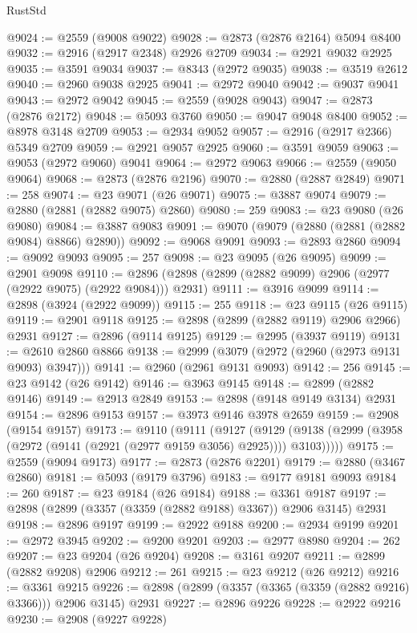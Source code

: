 \begin{lexlean}{RustStd}
\begin{coremodule}
@9024 := @2559 (@9008 @9022)
@9028 := @2873 (@2876 @2164) @5094 @8400
@9032 := @2916 (@2917 @2348) @2926 @2709
@9034 := @2921 @9032 @2925
@9035 := @3591 @9034
@9037 := @8343 (@2972 @9035)
@9038 := @3519 @2612
@9040 := @2960 @9038 @2925
@9041 := @2972 @9040
@9042 := @9037 @9041
@9043 := @2972 @9042
@9045 := @2559 (@9028 @9043)
@9047 := @2873 (@2876 @2172)
@9048 := @5093 @3760
@9050 := @9047 @9048 @8400
@9052 := @8978 @3148 @2709
@9053 := @2934 @9052
@9057 := @2916 (@2917 @2366) @5349 @2709
@9059 := @2921 @9057 @2925
@9060 := @3591 @9059
@9063 := @9053 (@2972 @9060) @9041
@9064 := @2972 @9063
@9066 := @2559 (@9050 @9064)
@9068 := @2873 (@2876 @2196)
@9070 := @2880 (@2887 @2849)
@9071 := 258
@9074 := @23 @9071 (@26 @9071)
@9075 := @3887 @9074
@9079 := @2880 (@2881 (@2882 @9075) @2860)
@9080 := 259
@9083 := @23 @9080 (@26 @9080)
@9084 := @3887 @9083
@9091 := @9070 (@9079 (@2880 (@2881 (@2882 @9084) @8866) @2890))
@9092 := @9068 @9091
@9093 := @2893 @2860
@9094 := @9092 @9093
@9095 := 257
@9098 := @23 @9095 (@26 @9095)
@9099 := @2901 @9098
@9110 := @2896 (@2898 (@2899 (@2882 @9099) @2906 (@2977 (@2922 @9075) (@2922 @9084))) @2931)
@9111 := @3916 @9099
@9114 := @2898 (@3924 (@2922 @9099))
@9115 := 255
@9118 := @23 @9115 (@26 @9115)
@9119 := @2901 @9118
@9125 := @2898 (@2899 (@2882 @9119) @2906 @2966) @2931
@9127 := @2896 (@9114 @9125)
@9129 := @2995 (@3937 @9119)
@9131 := @2610 @2860 @8866
@9138 := @2999 (@3079 (@2972 (@2960 (@2973 @9131 @9093) @3947)))
@9141 := @2960 (@2961 @9131 @9093)
@9142 := 256
@9145 := @23 @9142 (@26 @9142)
@9146 := @3963 @9145
@9148 := @2899 (@2882 @9146)
@9149 := @2913 @2849
@9153 := @2898 (@9148 @9149 @3134) @2931
@9154 := @2896 @9153
@9157 := @3973 @9146 @3978 @2659
@9159 := @2908 (@9154 @9157)
@9173 := @9110
    (@9111
      (@9127
        (@9129 (@9138 (@2999 (@3958 (@2972 (@9141 (@2921 (@2977 @9159 @3056) @2925)))) @3103)))))
@9175 := @2559 (@9094 @9173)
@9177 := @2873 (@2876 @2201)
@9179 := @2880 (@3467 @2860)
@9181 := @5093 (@9179 @3796)
@9183 := @9177 @9181 @9093
@9184 := 260
@9187 := @23 @9184 (@26 @9184)
@9188 := @3361 @9187
@9197 := @2898 (@2899 (@3357 (@3359 (@2882 @9188) @3367)) @2906 @3145) @2931
@9198 := @2896 @9197
@9199 := @2922 @9188
@9200 := @2934 @9199
@9201 := @2972 @3945
@9202 := @9200 @9201
@9203 := @2977 @8980
@9204 := 262
@9207 := @23 @9204 (@26 @9204)
@9208 := @3161 @9207
@9211 := @2899 (@2882 @9208) @2906
@9212 := 261
@9215 := @23 @9212 (@26 @9212)
@9216 := @3361 @9215
@9226 := @2898 (@2899 (@3357 (@3365 (@3359 (@2882 @9216) @3366))) @2906 @3145) @2931
@9227 := @2896 @9226
@9228 := @2922 @9216
@9230 := @2908 (@9227 @9228)

\end{coremodule}
\end{lexlean}
